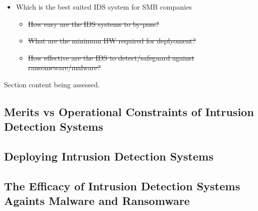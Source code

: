 \begin{notes}

    \begin{itemize}
        \item Which is the best suited IDS system for SMB companies
        \begin{itemize}
            \item \sout{How easy are the IDS systems to by-pass?}
            \item \sout{What are the minimum HW required for deplyoment?}
            \item \sout{How effective are the IDS to detect/safeguard against ransomeware/malware?}
        \end{itemize}

    \end{itemize}

    Section content being assessed.
    
\end{notes}


\subsection{Merits vs Operational Constraints of Intrusion Detection Systems}


\subsection{Deploying Intrusion Detection Systems}


\subsection{The Efficacy of Intrusion Detection Systems Againts Malware and Ransomware}

